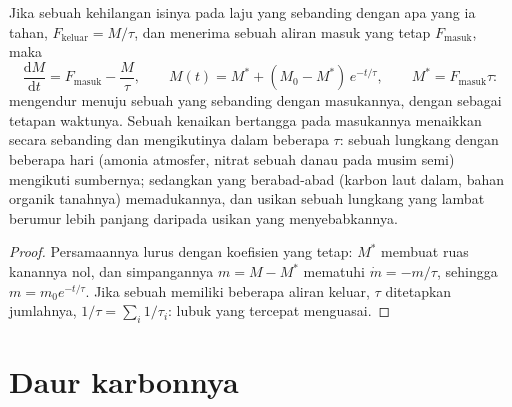 \begin{theorem}\label{thm:b2:biogeochemical-cycles:box}
Jika sebuah  kehilangan isinya pada laju yang sebanding dengan
apa yang ia tahan, $F_{\text{keluar}} = M/\tau$, dan menerima sebuah
aliran masuk yang tetap $F_{\text{masuk}}$, maka
\[
\frac{\mathrm{d}M}{\mathrm{d}t} = F_{\text{masuk}} - \frac{M}{\tau},
\qquad
M(t) = M^{*} + (M_0 - M^{*})\,e^{-t/\tau}, \qquad M^{*} = F_{\text{masuk}}\tau :
\]
 mengendur menuju sebuah  yang sebanding dengan
masukannya, dengan  sebagai tetapan waktunya. Sebuah
kenaikan bertangga pada masukannya menaikkan  secara
sebanding dan  mengikutinya dalam beberapa $\tau$: sebuah
lungkang dengan  beberapa hari (amonia atmosfer, nitrat
sebuah danau pada musim semi) mengikuti sumbernya; sedangkan yang
 berabad-abad (karbon laut dalam, bahan organik
tanahnya) memadukannya, dan usikan sebuah lungkang yang lambat berumur
lebih panjang daripada usikan yang menyebabkannya.
\end{theorem}
\begin{proof}
Persamaannya lurus dengan koefisien yang tetap: 
$M^{*}$ membuat ruas kanannya nol, dan simpangannya $m = M - M^{*}$
mematuhi $\dot m = -m/\tau$, sehingga $m = m_0 e^{-t/\tau}$. Jika
sebuah  memiliki beberapa aliran keluar, $\tau$ ditetapkan
jumlahnya, $1/\tau = \sum_i
1/\tau_i$: lubuk yang tercepat menguasai.
\end{proof}

\section{Daur karbonnya}


